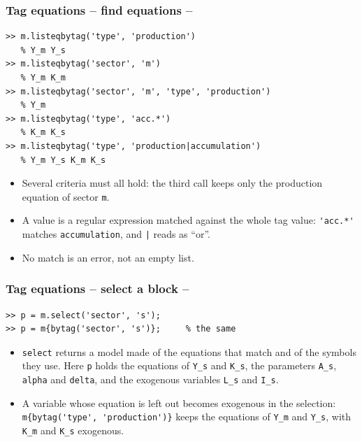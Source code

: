 \documentclass[10pt,slidestop]{beamer}
\theoremstyle{plain}
\begin{document}
\begin{frame}[fragile]
  \frametitle{Tag equations -- find equations --}

  \begin{lstlisting}[style=MatlabConsole,basicstyle=\ttfamily\scriptsize]
>> m.listeqbytag('type', 'production')
   % Y_m Y_s
>> m.listeqbytag('sector', 'm')
   % Y_m K_m
>> m.listeqbytag('sector', 'm', 'type', 'production')
   % Y_m
>> m.listeqbytag('type', 'acc.*')
   % K_m K_s
>> m.listeqbytag('type', 'production|accumulation')
   % Y_m Y_s K_m K_s
  \end{lstlisting}

  \begin{itemize}\small
  \item Several criteria must all hold: the third call keeps only the production
    equation of sector \verb+m+.
  \item A value is a regular expression matched against the whole tag value:
    \verb+'acc.*'+ matches \verb+accumulation+, and \verb+|+ reads as ``or''.
  \item No match is an error, not an empty list.
  \end{itemize}

\end{frame}


\begin{frame}[fragile]
  \frametitle{Tag equations -- select a block --}

  \begin{lstlisting}[style=MatlabConsole,basicstyle=\ttfamily\scriptsize]
>> p = m.select('sector', 's');
>> p = m{bytag('sector', 's')};     % the same
  \end{lstlisting}

  \begin{itemize}
  \item \verb+select+ returns a model made of the equations that match and of the
    symbols they use. Here \verb+p+ holds the equations of \verb+Y_s+ and \verb+K_s+,
    the parameters \verb+A_s+, \verb+alpha+ and \verb+delta+, and the exogenous
    variables \verb+L_s+ and \verb+I_s+.\newline
  \item A variable whose equation is left out becomes exogenous in the selection:
    \verb+m{bytag('type', 'production')}+ keeps the equations of \verb+Y_m+ and
    \verb+Y_s+, with \verb+K_m+ and \verb+K_s+ exogenous.
  \end{itemize}

\end{frame}
\end{document}
